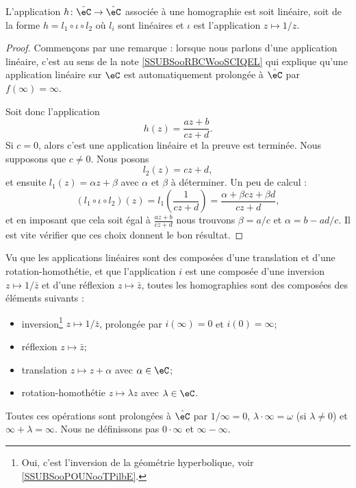\begin{proposition}      \label{PROPooSQFOooRginjJ}
    L'application \( h\colon \hat\eC\to \hat \eC\) associée à une homographie est soit linéaire, soit de la forme \( h=l_1\circ \iota\circ l_2\) où \( l_i\) sont linéaires et \( \iota\) est l'application \( z\mapsto 1/z\).
\end{proposition}

\begin{proof}
    Commençons par une remarque : lorsque nous parlons d'une application linéaire, c'est au sens de la note \ref{SSUBSooRBCWooSCIQEL} qui explique qu'une application linéaire sur \( \eC\) est automatiquement prolongée à \( \hat \eC\) par \( f(\infty)=\infty\).

    Soit donc l'application 
    \begin{equation}
        h(z)=\frac{ az+b }{ cz+d }.
    \end{equation}
    Si \( c=0\), alors c'est une application linéaire et la preuve est terminée. Nous supposons que \( c\neq 0\). Nous posons
    \begin{equation}
        l_2(z)=cz+d,
    \end{equation}
    et ensuite \( l_1(z)=\alpha z+\beta\) avec \( \alpha\) et \( \beta\) à déterminer. Un peu de calcul :
    \begin{equation}
        (l_1\circ \iota\circ l_2)(z)=l_1\left( \frac{1}{ cz+d } \right)=\frac{ \alpha+\beta c z+\beta d }{ cz+d },
    \end{equation}
    et en imposant que cela soit égal à \( \frac{ az+b }{ cz+d }\) nous trouvons \( \beta=a/c\) et \( \alpha=b-ad/c\). Il est vite vérifier que ces choix donnent le bon résultat.
\end{proof}

\begin{normaltext}      \label{NORMooMMKOooQlzjqJ}
    Vu que les applications linéaires sont des composées d'une translation et d'une rotation-homothétie, et que l'application \( i\) est une composée d'une inversion \( z\mapsto 1/\bar z\) et d'une réflexion \( z\mapsto \bar z\), toutes les homographies sont des composées des éléments suivants :
    \begin{itemize}
        \item inversion\footnote{Oui, c'est l'inversion de la géométrie hyperbolique, voir \ref{SSUBSooPOUNooTPilbE}.} \( z\mapsto 1/\bar z\), prolongée par \( i(\infty)=0\) et \( i(0)=\infty\);
        \item réflexion \( z\mapsto \bar z\);
        \item translation \( z\mapsto z+\alpha\) avec \( \alpha\in \eC\);
        \item rotation-homothétie \( z\mapsto \lambda z\) avec \( \lambda\in \eC\).
    \end{itemize}
    
    Toutes ces opérations sont prolongées à \( \hat\eC\) par \( 1/\infty=0\), \( \lambda\cdot \infty=\omega\) (si \( \lambda\neq 0\)) et \( \infty+\lambda=\infty\). Nous ne définissons pas \( 0\cdot \infty\) et \( \infty-\infty\).
\end{normaltext}


